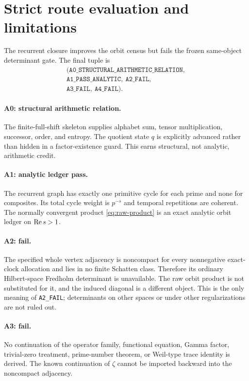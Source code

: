 \section{Strict route evaluation and limitations}
\label{sec:route}

The recurrent closure improves the orbit census but fails the frozen
same-object determinant gate.  The final tuple is
\[
\boxed{
\begin{gathered}
(\texttt{A0\_STRUCTURAL\_ARITHMETIC\_RELATION},\\
\texttt{A1\_PASS\_ANALYTIC},\ \texttt{A2\_FAIL},\\
\texttt{A3\_FAIL},\ \texttt{A4\_FAIL}).
\end{gathered}}
\]

\paragraph{A0: structural arithmetic relation.}
The finite-full-shift skeleton supplies alphabet sum, tensor multiplication,
successor, order, and entropy.  The quotient state $q$ is explicitly advanced
rather than hidden in a factor-existence guard.  This earns structural, not
analytic, arithmetic credit.

\paragraph{A1: analytic ledger pass.}
The recurrent graph has exactly one primitive cycle for each prime and none
for composites.  Its total cycle weight is $p^{-s}$ and temporal repetitions
are coherent.  The normally convergent product
\eqref{eq:raw-product} is an exact analytic orbit ledger on
$\operatorname{Re} s>1$.

\paragraph{A2: fail.}
The specified whole vertex adjacency is noncompact for every nonnegative
exact-clock allocation and lies in no finite Schatten class.  Therefore its
ordinary Hilbert-space Fredholm determinant is unavailable.  The raw orbit
product is not substituted for it, and the induced diagonal is a different
object.  This is the only meaning of \texttt{A2\_FAIL}; determinants on
other spaces or under other regularizations are not ruled out.

\paragraph{A3: fail.}
No continuation of the operator family, functional equation, Gamma factor,
trivial-zero treatment, prime-number theorem, or Weil-type trace identity is
derived.  The known continuation of $\zeta$ cannot be imported backward into
the noncompact adjacency.

